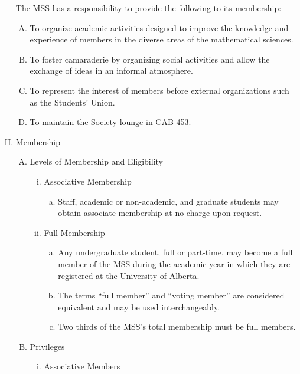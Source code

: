 \documentclass[11pt]{article}
\begin{document}
\begin{enumerate}[I.]
    The MSS has a responsibility to provide the following to its membership:
    \begin{enumerate}[A)]
      \item To organize academic activities designed to improve the knowledge
        and experience of members in the diverse areas of the mathematical
        sciences.
      \item To foster camaraderie by organizing social activities and allow the
        exchange of ideas in an informal atmosphere.
      \item To represent the interest of members before external organizations
        such as the Students' Union.
      \item To maintain the Society lounge in CAB 453.
    \end{enumerate}
  \item Membership
    \begin{enumerate}[A)]
      \item Levels of Membership and Eligibility
        \begin{enumerate}[i)]
          \item Associative Membership
            \begin{enumerate}[a)]
              \item Staff, academic or non-academic, and graduate students may
                obtain associate membership at no charge upon request.
            \end{enumerate}
          \item Full Membership
          \begin{enumerate}[a)]
              \item Any undergraduate student, full or part-time, may become a
                full member of the MSS during the academic year in which they
                are registered at the University of Alberta.
              \item The terms ``full member'' and ``voting member'' are
                considered equivalent and may be used interchangeably.
              \item Two thirds of the MSS's total membership must be full
                members.
            \end{enumerate}
        \end{enumerate}
      \item Privileges
        \begin{enumerate}[i)]
          \item Associative Members

\end{enumerate}
\end{enumerate}
\end{enumerate}
\end{document}
